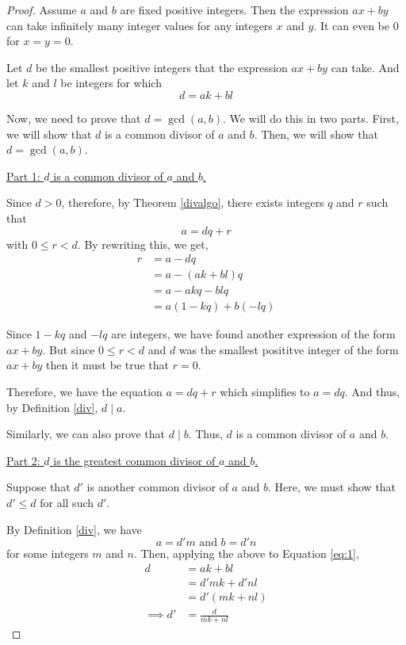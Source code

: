 \begin{proof}
	Assume $a$ and $b$ are fixed positive integers. Then the expression $ax+by$ can take infinitely many integer values for any integers $x$ and $y$. It can even be $0$ for $x = y = 0$.

	Let $d$ be the smallest positive integers that the expression $ax+by$ can take. And let $k$ and $l$ be integers for which
	\begin{equation} \label{eq:1}
		d = ak + bl
	\end{equation}

	Now, we need to prove that $d = \gcd(a,b)$. We will do this in two parts. First, we will show that $d$ is a common divisor of $a$ and $b$. Then, we will show that $d = \gcd(a,b)$.

	\underline{Part 1: $d$ is a common divisor of $a$ and $b$.}

	Since $d > 0$, therefore, by Theorem \ref{divalgo}, there exists integers $q$ and $r$ such that
	$$a = dq + r$$
	with $0 \leq r < d$. By rewriting this, we get,
	\begin{align}
		r & = a - dq           \\
		  & = a - (ak+bl)q     \\
		  & = a - akq - blq    \\
		  & = a(1-kq) + b(-lq)
	\end{align}

	Since $1-kq$ and $-lq$ are integers, we have found another expression of the form $ax + by$. But since $0 \leq r < d$ and $d$ was the smallest posititve integer of the form $ax+by$ then it must be true that $r = 0$.

	Therefore, we have the equation $a = dq + r$ which simplifies to $a = dq$. And thus, by Definition \ref{div}, $d \mid a$.

	Similarly, we can also prove that $d \mid b$.
	Thus, $d$ is a common divisor of $a$ and $b$.

	\bigbreak

	\underline{Part 2: $d$ is the greatest common divisor of $a$ and $b$.}

	Suppose that $d'$ is another common divisor of $a$ and $b$. Here, we must show that $d' \leq d$ for all such $d'$.

	By Definition \ref{div}, we have $$a = d'm \text{ and } b = d'n$$
	for some integers $m$ and $n$. Then, applying the above to Equation \ref{eq:1},
	\begin{align}
		d           & = ak + bl         \\
		            & = d'mk + d'nl     \\
		            & = d'(mk+nl)       \\
		\implies d' & = \frac{d}{mk+nl}
	\end{align}


\end{proof}
